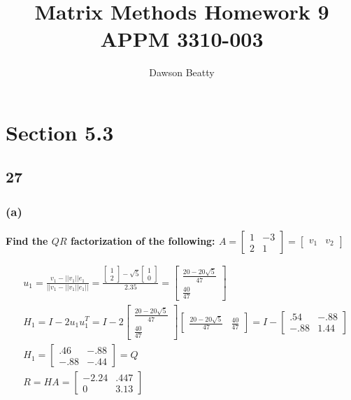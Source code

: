 \documentclass[10pt,letterpaper]{article}
\author{Dawson Beatty}
\title{Matrix Methods Homework 9 \\ APPM 3310-003}
\begin{document}
	\maketitle
	
	\section*{Section 5.3}
	\subsection*{27}
	\subsubsection*{(a)} \textbf{Find the $QR$ factorization of the following: $A = \begin{bmatrix}
		1 & -3 \\ 2 & 1
		\end{bmatrix} = \begin{bmatrix}
		v_1 & v_2
		\end{bmatrix}$}
		
		\begin{align*}
		& u_1 = \frac{v_1 - ||v_1||e_1}{||v_1 - ||v_1||e_1||} = \frac{\begin{bmatrix}
			1 \\ 2
			\end{bmatrix} - \sqrt{5} \begin{bmatrix}
			1 \\ 0
			\end{bmatrix}}{2.35} = \begin{bmatrix}
		\frac{20 - 20 \sqrt{5}}{47} \\ \frac{40}{47}
		\end{bmatrix} \\ 
		& H_1 = I - 2u_1u_1^T = I - 2 \begin{bmatrix}
		\frac{20 - 20 \sqrt{5}}{47} \\ \frac{40}{47}
		\end{bmatrix} \begin{bmatrix}
		\frac{20 - 20 \sqrt{5}}{47} & \frac{40}{47}
		\end{bmatrix} = I- \begin{bmatrix}
		.54 & -.88 \\ -.88 & 1.44
		\end{bmatrix} \\ 
		& H_1 = \boxed{\begin{bmatrix}
		.46 & -.88 \\ -.88 & -.44
		\end{bmatrix} = Q} \\ 
		& \boxed{R = HA = \begin{bmatrix}
		-2.24 & .447 \\ 0  & 3.13
		\end{bmatrix}}
		\end{align*}
\end{document}
